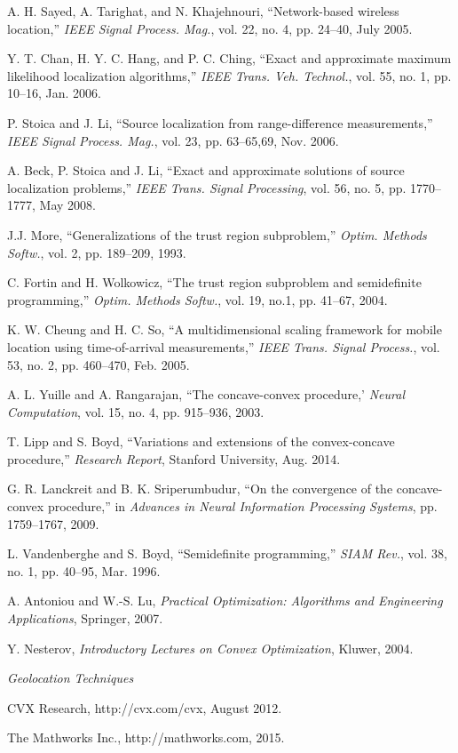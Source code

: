 \begin{thebibliography}{99}
A. H. Sayed, A. Tarighat, and N. Khajehnouri, ``Network-based wireless location,'' {\em IEEE Signal Process. Mag.}, vol. 22, no. 4, pp. 24--40, July 2005.

 Y. T. Chan, H. Y. C. Hang, and P. C. Ching, ``Exact and approximate maximum likelihood localization algorithms,'' {\em IEEE Trans. Veh. Technol.}, vol. 55, no. 1, pp. 10--16, Jan. 2006.

P. Stoica and J. Li, ``Source localization from range-difference measurements,'' {\em IEEE Signal Process. Mag.}, vol. 23, pp. 63--65,69, Nov.
2006.

A. Beck, P. Stoica and J. Li,  ``Exact and approximate solutions of source localization problems,'' {\em IEEE Trans. Signal Processing}, vol. 56, no. 5, pp. 1770--1777, May
2008.

J.J. More, ``Generalizations of the trust region subproblem,'' {\em Optim. Methods Softw.}, vol. 2, pp. 189--209, 1993.

C. Fortin and H. Wolkowicz, ``The trust region subproblem and semidefinite programming,'' {\em Optim. Methods Softw.}, vol. 19, no.1, pp. 41--67, 2004.

K. W. Cheung and H. C. So, ``A multidimensional scaling framework for mobile location using time-of-arrival measurements,'' {\em IEEE Trans. Signal Process.}, vol. 53, no. 2, pp. 460--470, Feb. 2005.

A. L. Yuille and A. Rangarajan, ``The concave-convex procedure,' {\em Neural Computation}, vol. 15, no. 4, pp. 915--936, 2003.

T. Lipp and S. Boyd, ``Variations and extensions of the convex-concave procedure,'' {\em Research Report}, Stanford University, Aug. 2014.

G. R. Lanckreit and B. K. Sriperumbudur, ``On the convergence of the concave-convex procedure,'' in  {\em Advances in Neural Information Processing Systems}, pp. 1759--1767, 2009.

L. Vandenberghe and S. Boyd, ``Semidefinite programming,'' {\em SIAM Rev.}, vol. 38, no. 1, pp. 40--95, Mar. 1996.

A. Antoniou and W.-S. Lu, {\em Practical Optimization: Algorithms and Engineering Applications}, Springer, 2007.

Y. Nesterov, {\em Introductory Lectures on Convex Optimization}, Kluwer, 2004.

{\em Geolocation Techniques}

CVX Research, http://cvx.com/cvx, August 2012.

The Mathworks Inc., http://mathworks.com, 2015.

\end{thebibliography}